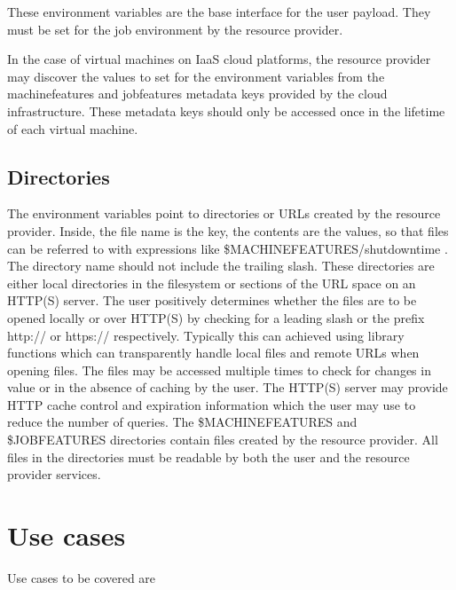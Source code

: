 \documentclass[12pt,a4paper]{article}
\begin{document}
These environment variables are the base interface for the user payload.
They must be set for the job environment by the resource provider. 

In the
case of virtual machines on IaaS cloud platforms, the resource provider may
discover the values to set for the environment variables from the
machinefeatures and jobfeatures metadata keys provided by the cloud
infrastructure. These metadata keys should only be accessed once in the
lifetime of each virtual machine.

\subsection{Directories}
\label{sec:Directories}

The environment variables point to directories or URLs created by the resource
provider. Inside, the file name is the key, the contents are the values, so
that files can be referred to with expressions like
\$MACHINEFEATURES/shutdowntime . The directory name should not include the
trailing slash. These directories are either local directories in the
filesystem or sections of the URL space on an HTTP(S) server. The user
positively determines whether the files are to be opened locally or over
HTTP(S) by checking for a leading slash or the prefix http:// or https://
respectively. Typically this can achieved using library functions which can
transparently handle local files and remote URLs when opening files. The
files may be accessed multiple times to check for changes in value or in the
absence of caching by the user. The HTTP(S) server may provide HTTP cache
control and expiration information which the user may use to reduce the
number of queries.
The \$MACHINEFEATURES and \$JOBFEATURES directories contain files created by
the resource provider.
All files in the directories must be readable by both the user and the
resource provider services.

\section{Use cases}
\label{sec:Use cases}

Use cases to be covered are
\end{document}
